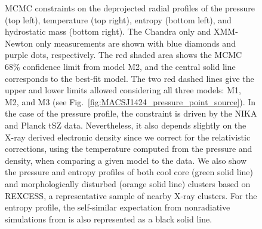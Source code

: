 \documentclass[traditabstract]{aa}
\newcommand{\rexcess}{{\gwpfont REXCESS}}
\begin{document}
\begin{figure}[h]
\caption{\footnotesize MCMC constraints on the deprojected radial profiles of the pressure (top left),  temperature (top right), entropy (bottom left), and  hydrostatic mass (bottom right). The Chandra only and XMM-Newton only measurements are shown with blue diamonds and purple dots, respectively. The red shaded area shows the MCMC 68\% confidence limit from model M2, and the central solid line corresponds to the best-fit model. The two red dashed lines give the upper and lower limits allowed considering all three models: M1, M2, and M3 (see Fig.~\ref{fig:MACSJ1424_pressure_point_source}). In the case of the pressure profile, the constraint is driven by the NIKA and Planck tSZ data. Nevertheless, it also depends slightly on the X-ray derived electronic density since we correct for the relativistic corrections, using the temperature computed from the pressure and density, when comparing a given model to the data. We also show the pressure \citep{arnaud2010} and entropy \citep{pratt2010} profiles of both cool core (green solid line) and morphologically disturbed (orange solid line) clusters based on \rexcess, a representative sample of nearby X-ray clusters. For the entropy profile, the self-similar expectation from nonradiative simulations from \cite{voit2005b} is also represented as a black solid line.}
\label{fig:MACSJ1424_MCMC_tk_profile}
\end{figure}
\end{document}
